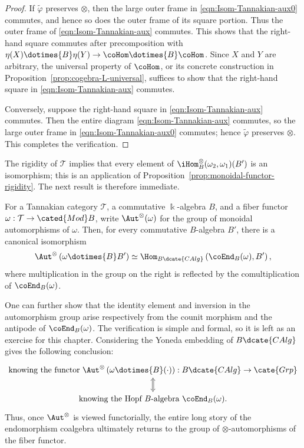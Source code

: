 \begin{proof}
	If $\tilde{\varphi}$ preserves $\otimes$, then the large outer frame in
	\eqref{eqn:Isom-Tannakian-aux0} commutes, and hence so does the outer frame
	of its square portion. Thus the outer frame of
	\eqref{eqn:Isom-Tannakian-aux} commutes. This shows that the right-hand
	square commutes after precomposition with
	$\eta(X)\dotimes{B}\eta(Y)\to\coHom\dotimes{B}\coHom$. Since $X$ and
	$Y$ are arbitrary, the universal property of $\coHom$, or its concrete
	construction in Proposition~\ref{prop:cogebra-L-universal}, suffices to
	show that the right-hand square in \eqref{eqn:Isom-Tannakian-aux}
	commutes.

	Conversely, suppose the right-hand square in
	\eqref{eqn:Isom-Tannakian-aux} commutes. Then the entire diagram
	\eqref{eqn:Isom-Tannakian-aux}
	commutes, so the large outer frame in \eqref{eqn:Isom-Tannakian-aux0}
	commutes; hence $\tilde{\varphi}$ preserves $\otimes$. This completes the
	verification.
\end{proof}

The rigidity of $\mathcal{T}$ implies that every element of
$\iHom^\otimes_B(\omega_2,\omega_1)(B')$ is an isomorphism; this is an
application of Proposition~\ref{prop:monoidal-functor-rigidity}. The next
result is therefore immediate.

\begin{corollary}\label{prop:Aut-Tannakian}
	For a Tannakian category $\mathcal{T}$, a commutative $\Bbbk$-algebra
	$B$, and a fiber functor $\omega:\mathcal{T}\to\cated{Mod}B$, write
	$\Aut^{\otimes}(\omega)$ for the group of monoidal automorphisms of
	$\omega$. Then, for every commutative $B$-algebra $B'$, there is a
	canonical isomorphism
	\[ \Aut^{\otimes}\left( \omega \dotimes{B} B' \right) \simeq \Hom_{B\dcate{CAlg}}\left(\coEnd_B(\omega), B' \right), \]
	where multiplication in the group on the right is reflected by the
	comultiplication of $\coEnd_B(\omega)$.
\end{corollary}

One can further show that the identity element and inversion in the
automorphism group arise respectively from the counit morphism and the
antipode of $\coEnd_B(\omega)$. The verification is simple and formal, so it
is left as an exercise for this chapter. Considering the Yoneda embedding of
$B\dcate{CAlg}$ gives the following conclusion:
\[\begin{tikzcd}
	\text{knowing the functor }\Aut^{\otimes}\left( \omega \dotimes{B} (\cdot)\right): B\dcate{CAlg} \to \cate{Grp} \arrow[Leftrightarrow, d] \\
	\text{knowing the Hopf $B$-algebra }\coEnd_B(\omega).
\end{tikzcd}\]
Thus, once $\Aut^{\otimes}$ is viewed functorially, the entire long story of
the endomorphism coalgebra ultimately returns to the group of
$\otimes$-automorphisms of the fiber functor.

